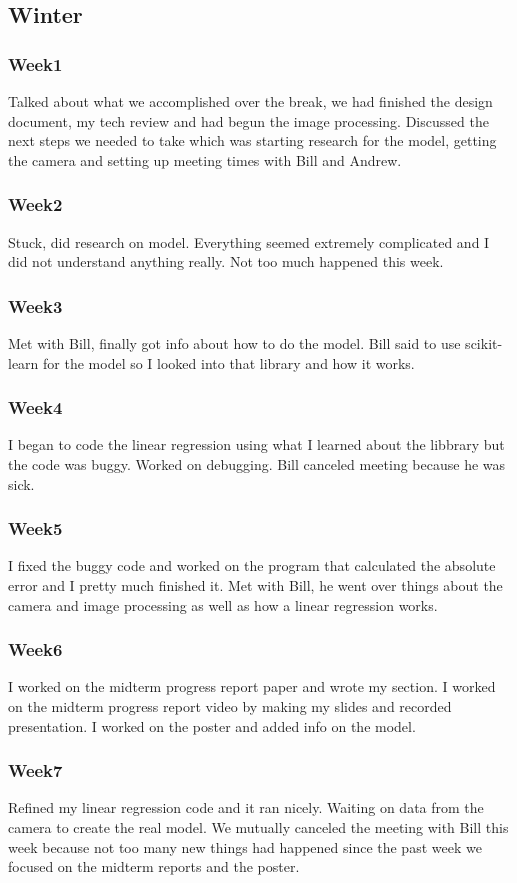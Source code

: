 \subsection*{Winter}
\subsubsection*{Week1}
Talked about what we accomplished over the break, we had finished the design document, my tech review and had begun the image processing. Discussed the next steps we needed to take which was starting research for the model, getting the camera and setting up meeting times with Bill and Andrew.
\subsubsection*{Week2}
Stuck, did research on model. Everything seemed extremely complicated and I did not understand anything really. Not too much happened this week.
\subsubsection*{Week3}
Met with Bill, finally got info about how to do the model. Bill said to use scikit-learn for the model so I looked into that library and how it works.
\subsubsection*{Week4}
I began to code the linear regression using what I learned about the libbrary but the code was buggy. Worked on debugging. Bill canceled meeting because he was sick.
\subsubsection*{Week5}
I fixed the buggy code and worked on the program that calculated the absolute error and I pretty much finished it. Met with Bill, he went over things about the camera and image processing as well as how a linear regression works.
\subsubsection*{Week6}
I worked on the midterm progress report paper and wrote my section. I worked on the midterm progress report video by making my slides and recorded presentation. I worked on the poster and added info on the model.
\subsubsection*{Week7}
Refined my linear regression code and it ran nicely. Waiting on data from the camera to create the real model. We mutually canceled the meeting with Bill this week because not too many new things had happened since the past week we focused on the midterm reports and the poster.
